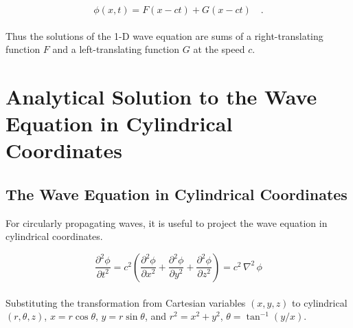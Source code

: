 \documentclass{homework}
\begin{document}
\[ \phi(x, t) = F(x - ct) + G(x - ct) \quad .\]
\\ \noindent
Thus the solutions of the 1-D wave equation are sums of a right-translating function $F$ and a left-translating function $G$ at the speed $c$.
\newpage
\section{Analytical Solution to the Wave Equation in Cylindrical Coordinates} \label{B}

\subsection{The Wave Equation in Cylindrical Coordinates}
For circularly propagating waves, it is useful to project the wave equation in cylindrical coordinates.

\[ \frac{\partial^2 \phi}{\partial t^2} = c^2 \left(\frac{\partial^2 \phi}{\partial x^2} + \frac{\partial^2 \phi}{\partial y^2} + \frac{\partial^2 \phi}{\partial z^2}  \right) = c^2 \,\nabla^2 \, \phi \]
\\ \noindent
Substituting the transformation from Cartesian variables $(x, y, z)$ to cylindrical $(r, \theta, z)$, $ x = r \cos{\theta}$, $y = r \sin{\theta}$, and $r^2 = x^2 + y^2$, $\theta =\tan^{-1} (y / x)$. 
\end{document}
